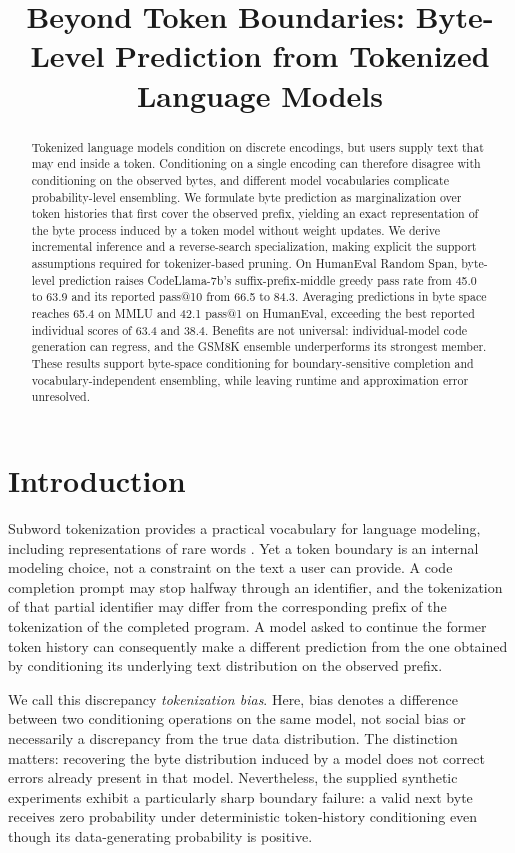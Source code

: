 \documentclass{article}
\title{Beyond Token Boundaries: Byte-Level Prediction from Tokenized Language Models}
\author{}
\begin{document}
\maketitle

\begin{abstract}
Tokenized language models condition on discrete encodings, but users supply text that may end inside a token. Conditioning on a single encoding can therefore disagree with conditioning on the observed bytes, and different model vocabularies complicate probability-level ensembling. We formulate byte prediction as marginalization over token histories that first cover the observed prefix, yielding an exact representation of the byte process induced by a token model without weight updates. We derive incremental inference and a reverse-search specialization, making explicit the support assumptions required for tokenizer-based pruning. On HumanEval Random Span, byte-level prediction raises CodeLlama-7b's suffix-prefix-middle greedy pass rate from 45.0 to 63.9 and its reported pass@10 from 66.5 to 84.3. Averaging predictions in byte space reaches 65.4 on MMLU and 42.1 pass@1 on HumanEval, exceeding the best reported individual scores of 63.4 and 38.4. Benefits are not universal: individual-model code generation can regress, and the GSM8K ensemble underperforms its strongest member. These results support byte-space conditioning for boundary-sensitive completion and vocabulary-independent ensembling, while leaving runtime and approximation error unresolved.
\end{abstract}

\section{Introduction}
\label{sec:intro}
Subword tokenization provides a practical vocabulary for language modeling, including representations of rare words \citep{sennrich2016}. Yet a token boundary is an internal modeling choice, not a constraint on the text a user can provide. A code completion prompt may stop halfway through an identifier, and the tokenization of that partial identifier may differ from the corresponding prefix of the tokenization of the completed program. A model asked to continue the former token history can consequently make a different prediction from the one obtained by conditioning its underlying text distribution on the observed prefix.

We call this discrepancy \emph{tokenization bias}. Here, bias denotes a difference between two conditioning operations on the same model, not social bias or necessarily a discrepancy from the true data distribution. The distinction matters: recovering the byte distribution induced by a model does not correct errors already present in that model. Nevertheless, the supplied synthetic experiments exhibit a particularly sharp boundary failure: a valid next byte receives zero probability under deterministic token-history conditioning even though its data-generating probability is positive.
\end{document}
